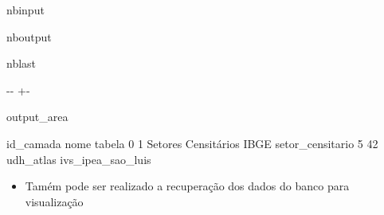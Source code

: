 \documentclass[letterpaper,10pt,brazil]{sphinxmanual}
\newlength\nbsphinxcodecellspacing
\begin{document}
\begin{sphinxuseclass}{nbinput}
{
\begin{sphinxVerbatim}[commandchars=\\\{\}]
\llap{\color{nbsphinxin}[3]:\,\hspace{\fboxrule}\hspace{\fboxsep}}  
 \PYG{p}{[}\PYG{p}{[} \PYG{p}{]}\PYG{p}{]}
\end{sphinxVerbatim}
}

\end{sphinxuseclass}
\begin{sphinxuseclass}{nboutput}
\begin{sphinxuseclass}{nblast}
{

\kern-\sphinxverbatimsmallskipamount\kern-\baselineskip
\kern+\FrameHeightAdjust\kern-\fboxrule
\vspace{\nbsphinxcodecellspacing}

\begin{sphinxuseclass}{output_area}
\begin{sphinxuseclass}{}


\begin{sphinxVerbatim}[commandchars=\\\{\}]
   id\_camada                      nome             tabela
0          1  Setores Censitários IBGE   setor\_censitario
5         42                 udh\_atlas  ivs\_ipea\_sao\_luis
\end{sphinxVerbatim}



\end{sphinxuseclass}
\end{sphinxuseclass}
}

\end{sphinxuseclass}
\end{sphinxuseclass}\begin{itemize}
\item {} 
\sphinxAtStartPar
Tamém pode ser realizado a recuperação dos dados do banco para visualização

\end{itemize}
\end{document}

